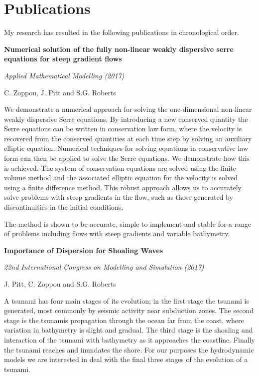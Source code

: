 \chapter{Publications}
\label{app:Pub}
My research has resulted in the following publications in chronological order.

\begin{center}
\textbf{
	 \Large Numerical solution of the fully non-linear weakly dispersive
serre equations for steep gradient flows}

\vspace*{\baselineskip}

\textit{Applied Mathematical Modelling (2017)}

{C. Zoppou, J. Pitt and S.G. Roberts}
\vspace*{0.5\baselineskip}
\end{center}
We demonstrate a numerical approach for solving the one-dimensional non-linear weakly dispersive Serre equations. By introducing a new conserved quantity the Serre equations can be written in conservation law form, where the velocity is recovered from the conserved quantities at each time step by solving an auxiliary elliptic equation. Numerical techniques for solving equations in conservative law form can then be applied to solve the	Serre equations. We demonstrate how this is achieved. The system of conservation equations are solved using the finite volume method and the associated elliptic equation for the velocity is solved using a finite difference method. This robust approach allows us to accurately solve problems with steep gradients in the flow, such as those generated by discontinuities in the initial conditions.

The method is shown to be accurate, simple to implement and stable for a range of problems including flows with steep gradients and variable bathymetry.


\newpage

\begin{center}
	\textbf{
		\Large Importance of Dispersion for Shoaling Waves}
	
	\vspace*{\baselineskip}
	
	\textit{22nd International Congress on Modelling and Simulation (2017)}
	
	{J. Pitt, C. Zoppou and S.G. Roberts}
	\vspace*{0.5\baselineskip}
\end{center}
A tsunami has four main stages of its evolution; in the first stage the tsunami is generated, most commonly by seismic activity near subduction zones. The second stage is the tsunamis propagation through the ocean far from the coast, where variation in bathymetry is slight and gradual. The third stage is the shoaling and interaction of the tsunami with bathymetry as it approaches the coastline. Finally the tsunami reaches and inundates the shore. For our purposes the hydrodynamic models we are interested in deal with the final three stages of the evolution of a tsunami.

